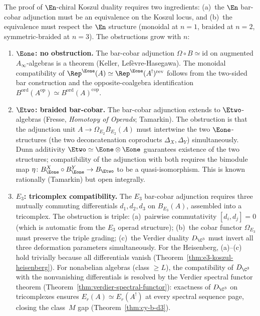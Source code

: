 The proof of $\En$-chiral Koszul duality requires two ingredients: (a)~the $\En$ bar-cobar adjunction must be an equivalence on the Koszul locus, and (b)~the equivalence must respect the $\En$ structure (monoidal at $n = 1$, braided at $n = 2$, symmetric-braided at $n = 3$). The obstructions grow with $n$:

\begin{enumerate}[label={\textup{$n = \arabic*$:}}]
 \item \textbf{$\Eone$: no obstruction.} The bar-cobar adjunction $\Omega \circ B \simeq \mathrm{id}$ on augmented $A_\infty$-algebras is a theorem (Keller, Lef\`evre-Hasegawa). The monoidal compatibility of $\Rep^{\Eone}(A) \simeq \Rep^{\Eone}(A^!)^{\mathrm{rev}}$ follows from the two-sided bar construction and the opposite-coalgebra identification $B^{\mathrm{ord}}(A^{\mathrm{op}}) \simeq B^{\mathrm{ord}}(A)^{\mathrm{cop}}$.

 \item \textbf{$\Etwo$: braided bar-cobar.} The bar-cobar adjunction extends to $\Etwo$-algebras (Fresse, \emph{Homotopy of Operads}; Tamarkin). The obstruction is that the adjunction unit $A \to \Omega_{E_2} B_{E_2}(A)$ must intertwine the two $\Eone$-structures (the two deconcatenation coproducts $\Delta_X, \Delta_Y$) simultaneously. Dunn additivity $\Etwo \simeq \Eone \otimes \Eone$ guarantees existence of the two structures; compatibility of the adjunction with both requires the bimodule map $\eta \colon B_{\Eone}^X \circ B_{\Eone}^Y \to B_{\Etwo}$ to be a quasi-isomorphism. This is known rationally (Tamarkin) but open integrally.

 \item \textbf{$E_3$: tricomplex compatibility.} The $E_3$ bar-cobar adjunction requires three mutually commuting differentials $d_1, d_2, d_3$ on $B_{E_3}(A)$, assembled into a tricomplex. The obstruction is triple: (a)~pairwise commutativity $[d_i, d_j] = 0$ (which is automatic from the $E_3$ operad structure); (b)~the cobar functor $\Omega_{E_3}$ must preserve the triple grading; (c)~the Verdier duality $D_{\C^3}$ must invert all three deformation parameters simultaneously. For the Heisenberg, (a)--(c) hold trivially because all differentials vanish (Theorem~\ref{thm:e3-koszul-heisenberg}). For nonabelian algebras (class $\geq L$), the compatibility of $D_{\C^3}$ with the nonvanishing differentials is resolved by the Verdier spectral functor theorem (Theorem~\ref{thm:verdier-spectral-functor}): exactness of $D_{\C^3}$ on tricomplexes ensures $E_r(A) \simeq E_r(A^!)$ at every spectral sequence page, closing the class~$M$ gap (Theorem~\ref{thm:cy-b-d3}).
\end{enumerate}

